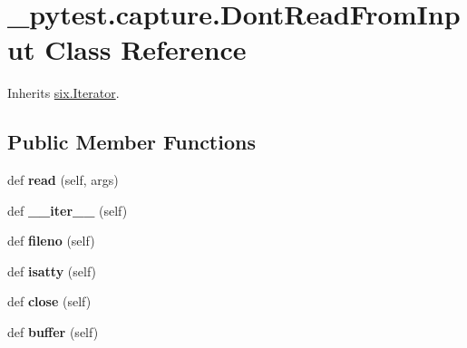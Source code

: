\hypertarget{class__pytest_1_1capture_1_1_dont_read_from_input}{}\section{\+\_\+pytest.\+capture.\+Dont\+Read\+From\+Input Class Reference}
\label{class__pytest_1_1capture_1_1_dont_read_from_input}


Inherits \hyperlink{classsix_1_1_iterator}{six.\+Iterator}.

\subsection*{Public Member Functions}
\begin{DoxyCompactItemize}
\item 
\mbox{\label{class__pytest_1_1capture_1_1_dont_read_from_input_a256e06905382869b26fc0853955d59e7}} 
def {\bfseries read} (self, args)
\item 
\mbox{\label{class__pytest_1_1capture_1_1_dont_read_from_input_a9f6f61718f378cd9768a56270ed0c24a}} 
def {\bfseries \+\_\+\+\_\+iter\+\_\+\+\_\+} (self)
\item 
\mbox{\label{class__pytest_1_1capture_1_1_dont_read_from_input_aaf1008ebc84f3cdbda23d4dda36f69ee}} 
def {\bfseries fileno} (self)
\item 
\mbox{\label{class__pytest_1_1capture_1_1_dont_read_from_input_a1e20d805e3cf46dc35c9af1418ede5bf}} 
def {\bfseries isatty} (self)
\item 
\mbox{\label{class__pytest_1_1capture_1_1_dont_read_from_input_a4a2f0d33ef3641c02fffc396a4bca36e}} 
def {\bfseries close} (self)
\item 
\mbox{\label{class__pytest_1_1capture_1_1_dont_read_from_input_ade9a934c1db3e7f64c9f14d3f85b3895}} 
def {\bfseries buffer} (self)
\end{DoxyCompactItemize}
